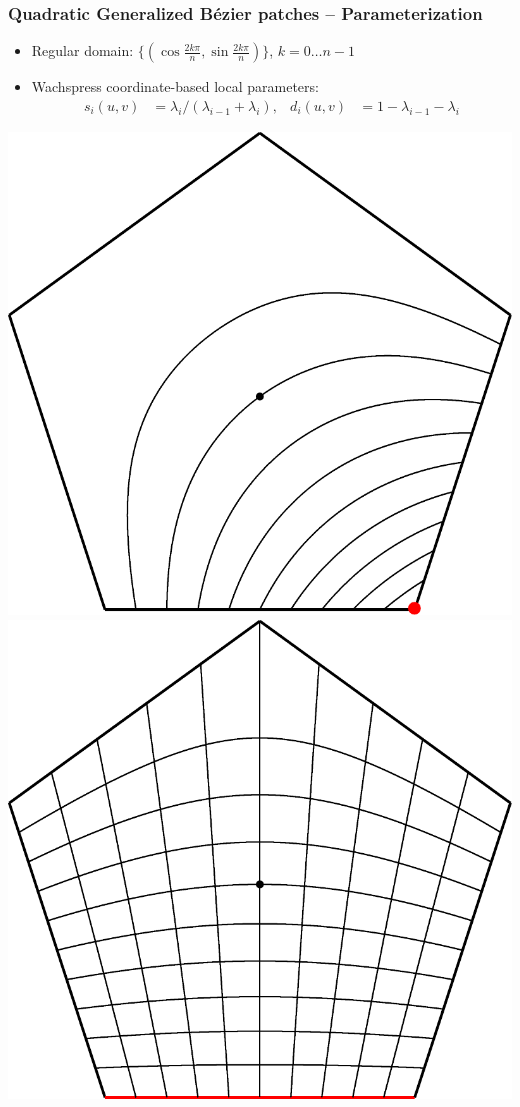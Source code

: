 \documentclass{beamer}
\begin{document}
\begin{frame}
  \frametitle{Quadratic Generalized B\'ezier patches -- Parameterization}
  \begin{itemize}
  \item Regular domain: $\{(\cos\frac{2k\pi}{n},\sin\frac{2k\pi}{n})\}$, $k=0\dots n-1$
  \item Wachspress coordinate-based local parameters:
  \[\begin{aligned}
  s_{i}(u,v)&=\lambda_{i}/(\lambda_{i-1}+\lambda_{i}),&d_{i}(u,v)&=1-\lambda_{i-1}-\lambda_{i}
  \end{aligned}\]
  \end{itemize}
  \includegraphics[width=.45\textwidth]{images/wachspress.pdf}\hfill
  \includegraphics[width=.45\textwidth]{images/sh-parameters.pdf}\\\vspace{1em}
\end{frame}
\end{document}
